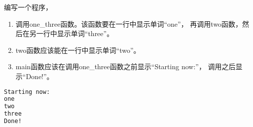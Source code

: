\begin{frame}[fragile]\ft{\secname}
\begin{wenti}
编写一个程序，
\begin{enumerate}
\item 调用one\_three函数。该函数要在一行中显示单词“one”，
再调用two函数，然后在另一行中显示单词“three”。
\item two函数应该能在一行中显示单词“two”。
\item main函数应该在调用one\_three函数之前显示“Starting now:”，
调用之后显示“Done!”。
\end{enumerate}
\end{wenti}
\begin{lstlisting}[language=tex]
Starting now:
one
two
three
Done!
\end{lstlisting}
\end{frame}




